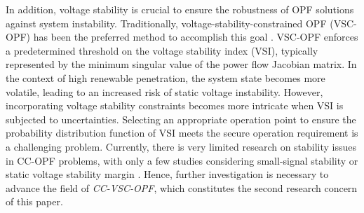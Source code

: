 \documentclass[journal]{IEEEtran}
\theoremstyle{definition}
\theoremstyle{remark}
\begin{document}
 In addition, voltage stability is crucial to ensure the robustness of OPF solutions against system instability. Traditionally, voltage-stability-constrained OPF (VSC-OPF) has been the preferred method to accomplish this goal \cite{jia2023voltage,cui2018new,avalos2008practical}. VSC-OPF enforces a predetermined threshold on the voltage stability index (VSI), typically represented by the minimum singular value of the power flow Jacobian matrix. In the context of high renewable penetration, the system state becomes more volatile, leading to an increased risk of static voltage instability.
 However, incorporating voltage stability constraints becomes more intricate when VSI is subjected to uncertainties. Selecting an appropriate operation point to ensure the probability distribution function of VSI meets the secure operation requirement is a challenging problem.
 Currently, there is very limited research on stability issues in CC-OPF problems, with only a few studies considering small-signal stability \cite{wang2023stability} or static voltage stability margin \cite{yang2022optimization}. 
 Hence, further investigation is necessary to advance the field of \textit{CC-VSC-OPF}, which constitutes the second research concern of this paper. 
\end{document}
